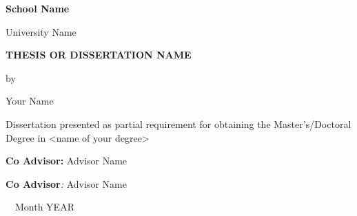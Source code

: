 \documentclass[../Main_PhD_Dissertation.tex]{subfiles}
\title{}
\author{Susana Maria Santos do Paco}
\date{2021-07-24}
\begin{document}
\vspace {25mm}
	{\centering
		\textbf{School Name }
		\par}
\vspace {3mm}

\vspace {3mm}
	{\centering
		{University Name}
		\par}
	
\vspace {20mm}
	
	{\centering
		\textbf{\MakeUppercase{ Thesis or Dissertation Name }}
		\par}
\vspace {13mm}
	{\centering
		{by}
		\par}
\vspace {13mm}	
	{\centering
		{Your Name}
		\par}
	
\vspace {55mm}
	
	\foreignlanguage{english}{Dissertation presented as partial requirement for obtaining the Master's/Doctoral Degree in <name of your degree>}
	
\vspace {28mm}	

	
	\foreignlanguage{english}{\textbf{Co Advisor:}}\foreignlanguage{english}{\textit{ }}\foreignlanguage{english}{Advisor Name}

\vspace {6mm}
	
	\foreignlanguage{english}{\textbf{Co Advisor}}\foreignlanguage{english}{\textit{: }}\foreignlanguage{english}{Advisor
		Name}
	
	
\vspace {30mm}
	
	

	
\begin{center}
		\foreignlanguage{english}{\ \ Month YEAR\ \ }
\end{center}
\end{document}
